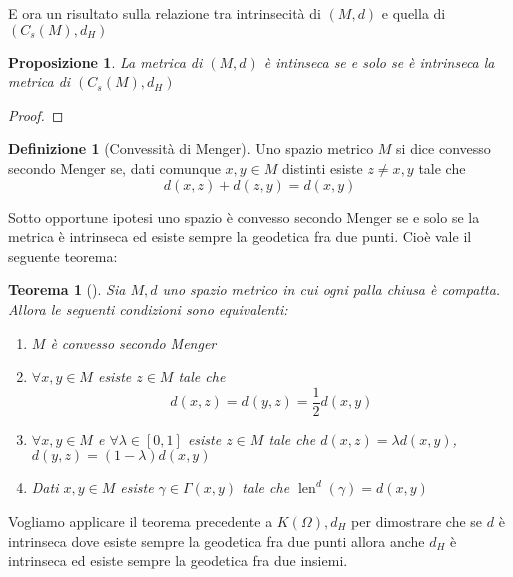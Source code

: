 \documentclass[a4paper,10pt]{article}
\newcounter{counter1}
\theoremstyle{plain}
\newtheorem{myteo}[counter1]{Teorema}
\newtheorem{mypro}[counter1]{Proposizione}
\theoremstyle{definition}
\newtheorem{mydef}[counter1]{Definizione}
\theoremstyle{remark}
\newcommand{\pa}[1]{\left(#1\right)}
\newcommand{\bra}[1]{\left[#1\right]}
\DeclareMathOperator{\len}{len}
\begin{document}
E ora un risultato sulla relazione tra intrinsecità di $(M,d)$ e
quella di $\pa{C_s(M),d_H}$
\begin{mypro}
  La metrica di $(M,d)$ è intinseca se e solo se è intrinseca la
  metrica di $(C_s(M),d_H)$
\end{mypro}
\begin{proof}
  
\end{proof}


\begin{mydef}[Convessità di Menger]
  Uno spazio metrico $M$ si dice convesso secondo Menger se, dati
  comunque $x,y \in M$ distinti esiste $z\neq x,y$ tale che
  \[ d(x,z) + d(z,y) = d(x,y) \]
\end{mydef}


Sotto opportune ipotesi uno spazio è convesso secondo Menger se e solo
se la metrica è intrinseca ed esiste sempre la geodetica fra due
punti. Cioè vale il seguente teorema:

\begin{myteo}[{\cite[Teorema 2.6.2]{papadopoulos2013metric}}]
  Sia $M,d$ uno spazio metrico in cui ogni palla chiusa è
  compatta. Allora le seguenti condizioni sono equivalenti:
  \begin{enumerate}
  \item $M$ è convesso secondo Menger
  \item $\forall x,y \in M$ esiste $z\in M$ tale che 
    \[ d(x,z) = d(y,z) = \frac{1}{2} d(x,y) \]
  \item $\forall x,y \in M$ e $\forall \lambda \in \bra{0,1}$ esiste
    $z\in M$ tale che $d(x,z) = \lambda d(x,y)$, $d(y,z) = (1-\lambda)
    d(x,y)$ 
  \item Dati $x,y \in M$ esiste $\gamma \in \Gamma(x,y)$ tale che
    $\len ^d (\gamma) = d(x,y)$
  \end{enumerate}
\end{myteo}

Vogliamo applicare il teorema precedente a $K(\Omega),d_H$ per
dimostrare che se $d$ è intrinseca dove esiste sempre la geodetica fra
due punti allora anche $d_H$ è intrinseca ed esiste sempre la
geodetica fra due insiemi.
\end{document}
